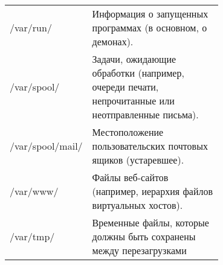 \begin{center}
\begin{longtable}[p]{|l|p{0.7\linewidth}|}
/var/run/ &	Информация о запущенных программах (в основном, о демонах). \\
/var/spool/ &	Задачи, ожидающие обработки (например, очереди печати, непрочитанные или неотправленные письма). \\
/var/spool/mail/ &	Местоположение пользовательских почтовых ящиков (устаревшее). \\
/var/www/ &	Файлы веб-сайтов (например, иерархия файлов виртуальных хостов). \\
/var/tmp/ &	Временные файлы, которые должны быть сохранены между перезагрузками \\
\hline
\end{longtable}
\end{center}
